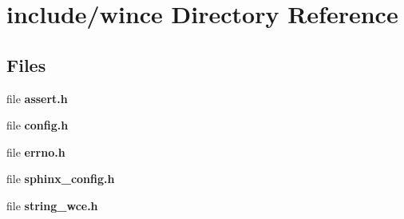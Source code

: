 \section{include/wince Directory Reference}
\label{dir_62c6e5a1b0f237231e4a7e8e8a0f0425}
\subsection*{Files}
\begin{DoxyCompactItemize}
\item 
file {\bfseries assert.\-h}
\item 
file {\bfseries config.\-h}
\item 
file {\bfseries errno.\-h}
\item 
file {\bfseries sphinx\-\_\-config.\-h}
\item 
file {\bfseries string\-\_\-wce.\-h}
\end{DoxyCompactItemize}
